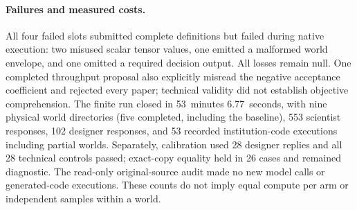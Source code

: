 \paragraph{Failures and measured costs.}
All four failed slots submitted complete definitions but failed during native
execution: two misused scalar tensor values, one emitted a malformed world
envelope, and one omitted a required decision output. All losses remain null.
One completed throughput proposal also explicitly misread the negative
acceptance coefficient and rejected every paper; technical validity did not
establish objective comprehension. The finite run closed in 53~minutes
6.77~seconds, with nine physical world directories (five completed, including
the baseline), 553 scientist responses, 102 designer responses, and 53 recorded
institution-code executions including partial worlds. Separately, calibration
used 28 designer replies and all 28 technical controls passed; exact-copy
equality held in 26 cases and remained diagnostic. The read-only original-source
audit made no new model calls or generated-code executions. These counts do not
imply equal compute per arm or independent samples within a world.
